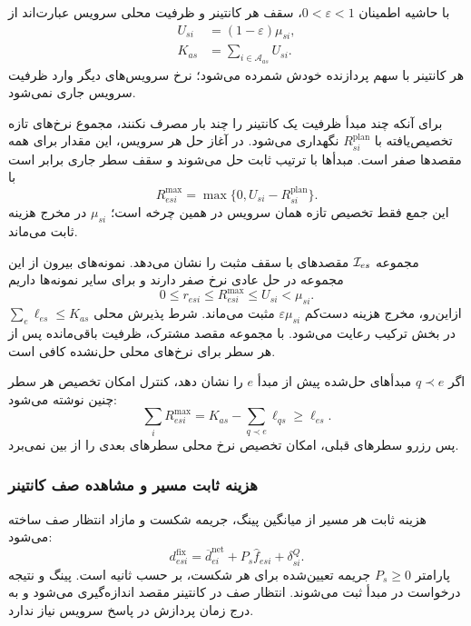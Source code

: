با حاشیه اطمینان $0<\varepsilon<1$، سقف هر کانتینر و ظرفیت محلی سرویس عبارت‌اند از
\begin{align}
 U_{si}&=(1-\varepsilon)\mu_{si},
 \label{eq:global-cap}\\
 K_{as}&=\sum_{i\in\mathcal A_{as}}U_{si}.
 \label{eq:local-capacity}
\end{align}
هر کانتینر با سهم پردازنده خودش شمرده می‌شود؛ نرخ سرویس‌های دیگر وارد ظرفیت سرویس جاری نمی‌شود.

برای آنکه چند مبدأ ظرفیت یک کانتینر را چند بار مصرف نکنند، مجموع نرخ‌های تازه تخصیص‌یافته با $R^{\mathrm{plan}}_{si}$ نگهداری می‌شود. در آغاز حل هر سرویس، این مقدار برای همه مقصدها صفر است. مبدأها با ترتیب ثابت حل می‌شوند و سقف سطر جاری برابر است با
\begin{equation}
 R^{\mathrm{max}}_{esi}=\max\{0,U_{si}-R^{\mathrm{plan}}_{si}\}.
 \label{eq:remaining}
\end{equation}
این جمع فقط تخصیص تازه همان سرویس در همین چرخه است؛ $\mu_{si}$ در مخرج هزینه ثابت می‌ماند.

مجموعه $\mathcal I_{es}$ مقصدهای با سقف مثبت را نشان می‌دهد. نمونه‌های بیرون از این مجموعه در حل عادی نرخ صفر دارند و برای سایر نمونه‌ها داریم
\begin{equation}
 0\leq r_{esi}\leq R^{\mathrm{max}}_{esi}\leq U_{si}<\mu_{si}.
 \label{eq:domain}
\end{equation}
ازاین‌رو، مخرج هزینه دست‌کم $\varepsilon\mu_{si}$ مثبت می‌ماند. شرط پذیرش محلی $\sum_e\ell_{es}\leq K_{as}$ در بخش ترکیب رعایت می‌شود. با مجموعه مقصد مشترک، ظرفیت باقی‌مانده پس از هر سطر برای نرخ‌های محلی حل‌نشده کافی است.

اگر $q\prec e$ مبدأهای حل‌شده پیش از مبدأ $e$ را نشان دهد، کنترل امکان تخصیص هر سطر چنین نوشته می‌شود:
\begin{equation}
 \sum_i R^{\mathrm{max}}_{esi}
   =K_{as}-\sum_{q\prec e}\ell_{qs}\geq\ell_{es}.
 \label{eq:row-feasibility}
\end{equation}
پس رزرو سطرهای قبلی، امکان تخصیص نرخ محلی سطرهای بعدی را از بین نمی‌برد.


\subsubsection{هزینه ثابت مسیر و مشاهده صف کانتینر}

هزینه ثابت هر مسیر از میانگین پینگ، جریمه شکست و مازاد انتظار صف ساخته می‌شود:
\begin{equation}
 d^{\mathrm{fix}}_{esi}=\overline d^{\mathrm{net}}_{ei}
                   +P_s\widehat f_{esi}+\delta^Q_{si}.
 \label{eq:fixed-cost}
\end{equation}
پارامتر $P_s\geq0$ جریمه تعیین‌شده برای هر شکست، بر حسب ثانیه است. پینگ و نتیجه درخواست در مبدأ ثبت می‌شوند. انتظار صف در کانتینر مقصد اندازه‌گیری می‌شود و به درج زمان پردازش در پاسخ سرویس نیاز ندارد.

